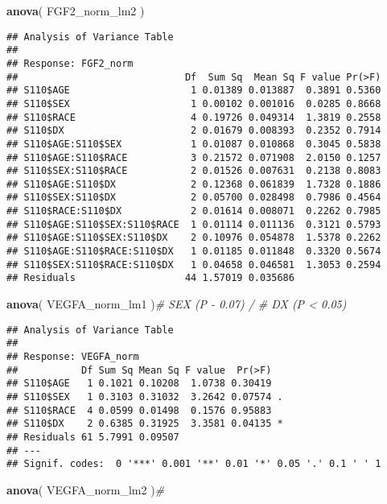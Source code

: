\documentclass[]{article}
\newenvironment{Shaded}{\begin{snugshade}}{\end{snugshade}}
\newcommand{\CommentTok}[1]{\textcolor[rgb]{0.56,0.35,0.01}{\textit{#1}}}
\newcommand{\KeywordTok}[1]{\textcolor[rgb]{0.13,0.29,0.53}{\textbf{#1}}}
\newcommand{\NormalTok}[1]{#1}
\begin{document}
\begin{Shaded}
\begin{Highlighting}[]
\KeywordTok{anova}\NormalTok{(  FGF2_norm_lm2   )}
\end{Highlighting}
\end{Shaded}

\begin{verbatim}
## Analysis of Variance Table
## 
## Response: FGF2_norm
##                             Df  Sum Sq  Mean Sq F value Pr(>F)
## S110$AGE                     1 0.01389 0.013887  0.3891 0.5360
## S110$SEX                     1 0.00102 0.001016  0.0285 0.8668
## S110$RACE                    4 0.19726 0.049314  1.3819 0.2558
## S110$DX                      2 0.01679 0.008393  0.2352 0.7914
## S110$AGE:S110$SEX            1 0.01087 0.010868  0.3045 0.5838
## S110$AGE:S110$RACE           3 0.21572 0.071908  2.0150 0.1257
## S110$SEX:S110$RACE           2 0.01526 0.007631  0.2138 0.8083
## S110$AGE:S110$DX             2 0.12368 0.061839  1.7328 0.1886
## S110$SEX:S110$DX             2 0.05700 0.028498  0.7986 0.4564
## S110$RACE:S110$DX            2 0.01614 0.008071  0.2262 0.7985
## S110$AGE:S110$SEX:S110$RACE  1 0.01114 0.011136  0.3121 0.5793
## S110$AGE:S110$SEX:S110$DX    2 0.10976 0.054878  1.5378 0.2262
## S110$AGE:S110$RACE:S110$DX   1 0.01185 0.011848  0.3320 0.5674
## S110$SEX:S110$RACE:S110$DX   1 0.04658 0.046581  1.3053 0.2594
## Residuals                   44 1.57019 0.035686
\end{verbatim}

\begin{Shaded}
\begin{Highlighting}[]
\KeywordTok{anova}\NormalTok{(  VEGFA_norm_lm1  )}\CommentTok{# SEX (P - 0.07) / # DX (P < 0.05)}
\end{Highlighting}
\end{Shaded}

\begin{verbatim}
## Analysis of Variance Table
## 
## Response: VEGFA_norm
##           Df Sum Sq Mean Sq F value  Pr(>F)  
## S110$AGE   1 0.1021 0.10208  1.0738 0.30419  
## S110$SEX   1 0.3103 0.31032  3.2642 0.07574 .
## S110$RACE  4 0.0599 0.01498  0.1576 0.95883  
## S110$DX    2 0.6385 0.31925  3.3581 0.04135 *
## Residuals 61 5.7991 0.09507                  
## ---
## Signif. codes:  0 '***' 0.001 '**' 0.01 '*' 0.05 '.' 0.1 ' ' 1
\end{verbatim}

\begin{Shaded}
\begin{Highlighting}[]
\KeywordTok{anova}\NormalTok{(  VEGFA_norm_lm2  )}\CommentTok{#}
\end{Highlighting}
\end{Shaded}
\end{document}
